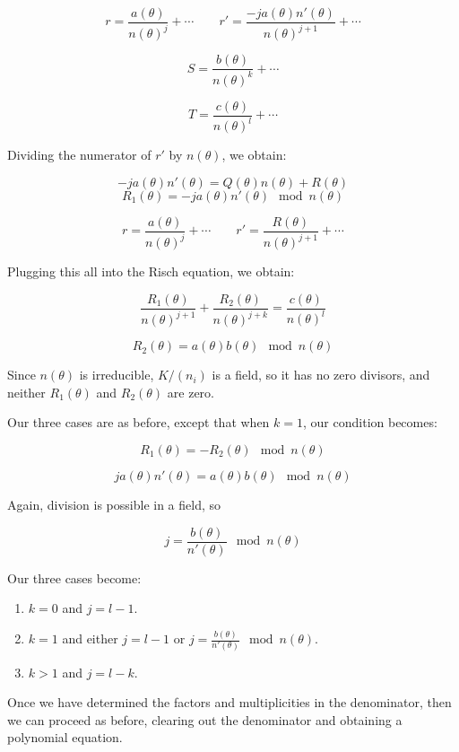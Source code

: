 $$r = \frac{a(\theta)}{n(\theta)^j} + \cdots  \qquad  r' = \frac{-ja(\theta)n'(\theta)}{n(\theta)^{j+1}} + \cdots$$

$$S = \frac{b(\theta)}{n(\theta)^k} + \cdots$$

$$T = \frac{c(\theta)}{n(\theta)^l} + \cdots$$

Dividing the numerator of $r'$ by $n(\theta)$, we obtain:

$$-ja(\theta)n'(\theta) = Q(\theta) n(\theta) + R(\theta)$$
$$R_1(\theta) = -ja(\theta)n'(\theta) \mod n(\theta)$$

$$r = \frac{a(\theta)}{n(\theta)^j} + \cdots  \qquad  r' = \frac{R(\theta)}{n(\theta)^{j+1}} + \cdots$$

Plugging this all into the Risch equation, we obtain:

$$\frac{R_1(\theta)}{n(\theta)^{j+1}} + \frac{R_2(\theta)}{n(\theta)^{j+k}} = \frac{c(\theta)}{n(\theta)^l}$$

$$R_2(\theta) = a(\theta)b(\theta) \mod n(\theta)$$

Since $n(\theta)$ is irreducible, $K/(n_i)$ is a field, so it has no zero divisors, and
neither $R_1(\theta)$ and $R_2(\theta)$ are zero.

Our three cases are as before, except that when $k=1$, our condition becomes:

$$R_1(\theta) = -R_2(\theta) \mod n(\theta)$$

$$ja(\theta)n'(\theta) = a(\theta)b(\theta) \mod n(\theta)$$

Again, division is possible in a field, so

$$j = \frac{b(\theta)}{n'(\theta)} \mod n(\theta)$$

Our three cases become:

\begin{enumerate}

\item $k=0$ and $j = l-1$.

\item $k=1$ and either $j=l-1$ or $j = \frac{b(\theta)}{n'(\theta)} \mod n(\theta)$.

\item $k>1$ and $j=l-k$.

\end{enumerate}

Once we have determined the factors and multiplicities in the denominator,
then we can proceed as before, clearing out the denominator and obtaining
a polynomial equation.

\vfill\eject

